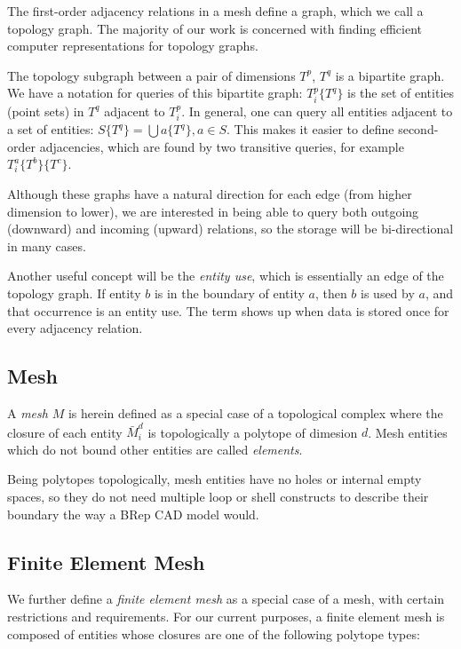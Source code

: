 The first-order adjacency relations in a mesh define a graph,
which we call a topology graph.
The majority of our work is concerned with finding
efficient computer representations for topology graphs.

The topology subgraph between a pair of dimensions $T^p$, $T^q$
is a bipartite graph.
We have a notation for queries of this bipartite graph:
$T^p_i\{T^q\}$ is the set of entities (point sets) in $T^q$ adjacent to
$T^p_i$.
In general, one can query all entities adjacent
to a set of entities: $S\{T^q\} = \bigcup a \{T^q\}, a \in S$.
This makes it easier to define second-order adjacencies,
which are found by two transitive queries,
for example $T^a_i\{T^b\}\{T^c\}$.

Although these graphs have a natural direction for each
edge (from higher dimension to lower), we are interested
in being able to query both outgoing (downward) and
incoming (upward) relations, so the storage will be
bi-directional in many cases.

Another useful concept will be the {\it entity use},
which is essentially an edge of the topology graph.
If entity $b$ is in the boundary of entity $a$, then
$b$ is used by $a$, and that occurrence is an entity use.
The term shows up when data is stored once for every adjacency relation.

\subsection{Mesh}
\label{sec:def_mesh}

A {\it mesh} $M$ is herein defined as a special case of a topological
complex where the closure of each entity $\bar{M}^d_i$
is topologically a polytope of dimesion $d$.
Mesh entities which do not bound other entities
are called \emph{elements}.

Being polytopes topologically, mesh entities have no
holes or internal empty spaces,
so they do not need multiple loop or shell constructs to
describe their boundary the way a BRep CAD model would.

\subsection{Finite Element Mesh}
\label{sec:def_fem}

We further define a {\it finite element mesh} as a special case
of a mesh, with certain restrictions and requirements.
For our current purposes, a finite element mesh is composed
of entities whose closures are one of the following
polytope types:

